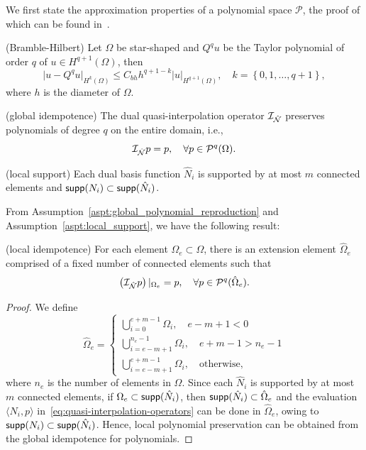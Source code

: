 We first state the approximation properties of a polynomial space $\mathcal{P}$, the proof of which can be found in~\cite{brenner_mathematical_2007}.
\begin{lemma}\label{lm:bramble-hilbert}
	(Bramble-Hilbert) Let $\Omega$ be star-shaped and $Q^qu$ be the Taylor polynomial of order $q$ of $u\in{H}^{q+1}(\Omega)$, then
	\begin{equation}
		\vert{u-Q^qu}\vert_{H^k(\Omega)}\leq{}C_{bh}h^{q+1-k}\vert{u}\vert_{H^{q+1}(\Omega)},\quad{}k=\left\{0,1,\dots,q+1\right\},
	\end{equation}
	where $h$ is the diameter of $\Omega$.
\end{lemma}

\begin{assumption}\label{aspt:global_polynomial_reproduction}
	(global idempotence) The dual quasi-interpolation operator $\mathcal{I}_{\hat{\mathcal{N}}}$ preserves polynomials of degree $q$ on the entire domain, i.e.,
	\begin{equation}
		\mathcal{I}_{\hat{\mathcal{N}}}p=p,\quad\forall{}p\in\mathcal{P}^q{(\Omega)}.
	\end{equation}
\end{assumption}

\begin{assumption}\label{aspt:local_support}
	(local support) Each dual basis function $\hat{N}_i$ is supported by at most $m$ connected elements and $\mathop{\mathsf{supp}}({N}_i)\subset\mathop{\mathsf{supp}}(\hat{N}_i)$.
\end{assumption}

From Assumption~\ref{aspt:global_polynomial_reproduction} and Assumption~\ref{aspt:local_support}, we have the following result:
\begin{lemma}\label{lemma:local_polynomial_reproduction}
	(local idempotence) For each element $\Omega_e\subset\Omega$, there is an extension element $\hat{\Omega}_e$ comprised of a fixed number of connected elements such that
	\begin{equation}
		\left(\mathcal{I}_{\hat{\mathcal{N}}}p\right)\vert_{\Omega_e}=p,\quad\forall{}p\in\mathcal{P}^q{(\hat{\Omega}_e)}.
	\end{equation}
	\begin{proof}
		We define
		\begin{equation}
			\hat{\Omega}_e=
			\begin{cases}
				\bigcup_{i=0}^{e+m-1}\Omega_i,\quad{e-m+1<0}         \\
				\bigcup_{i=e-m+1}^{n_e-1}\Omega_i,\quad{e+m-1>n_e-1} \\
				\bigcup_{i=e-m+1}^{e+m-1}\Omega_i,\quad\text{otherwise},
			\end{cases}
		\end{equation}
		where $n_e$ is the number of elements in $\Omega$. Since each $\hat{N}_i$ is supported by at most $m$ connected elements, if $\Omega_e\subset\mathop{\mathsf{supp}}(\hat{N}_i)$, then $\mathop{\mathsf{supp}}(\hat{N}_i)\subset\hat{\Omega}_e$ and the evaluation $\langle{N_i,p}\rangle$ in~\eqref{eq:quasi-interpolation-operators} can be done in $\hat{\Omega}_e$, owing to $\mathop{\mathsf{supp}}({N}_i)\subset\mathop{\mathsf{supp}}(\hat{N}_i)$. Hence, local polynomial preservation can be obtained from the global idempotence for polynomials.
	\end{proof}
\end{lemma}

